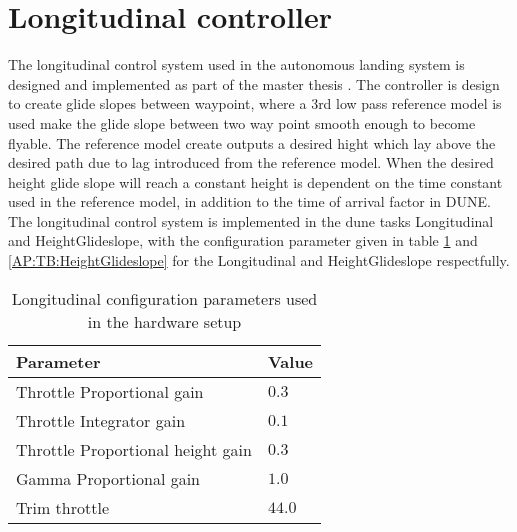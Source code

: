 \section{Longitudinal controller}
The longitudinal control system used in the autonomous landing system is designed and implemented as part of the master thesis \citep{Sigurd}. The controller is design to create glide slopes between waypoint, where a 3rd low pass reference model is used make the glide slope between two way point smooth enough to become flyable. The reference model create outputs a desired hight which lay above the desired path due to lag introduced from the reference model. When the desired height glide slope will reach a constant height is dependent on the time constant used in the reference model, in addition to the time of arrival factor in DUNE. The longitudinal control system is implemented in the \gls{dune} tasks Longitudinal and HeightGlideslope, with the configuration parameter given in table \ref{AP:TB:Longitudianl} and \ref{AP:TB:HeightGlideslope} for the Longitudinal and HeightGlideslope respectfully.
\begin{table}[H]
\centering
\begin{tabular}{| l | l |}
\hline
\textbf{Parameter}	&	\textbf{Value} \\ \hline
Throttle Proportional gain          &    $0.3$ \\ \hline
Throttle Integrator gain            &    $0.1$ \\ \hline
Throttle Proportional height gain   &    $0.3$ \\ \hline
Gamma Proportional gain             &    $1.0$ \\ \hline
Trim throttle                       &    $44.0$ \\ \hline
\end{tabular}
\caption{Longitudinal configuration parameters used in the hardware setup}
\label{AP:TB:Longitudianl}
\end{table}

